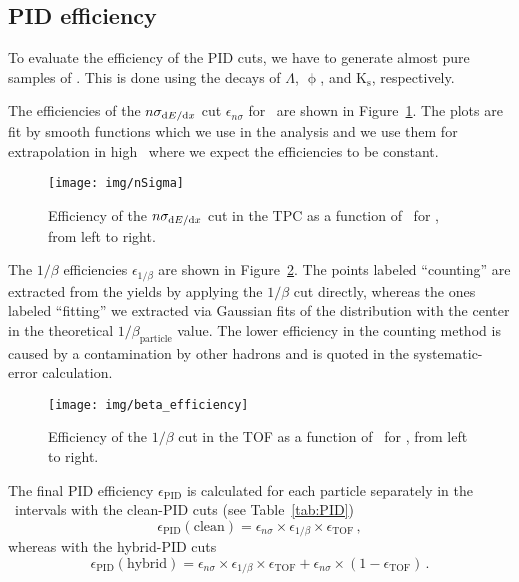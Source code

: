 \subsection{PID efficiency\label{pidEff}}

To evaluate the efficiency of the PID cuts, we have to generate almost pure samples of \pKandpi\@. This is done using the decays of  $\Lambda$, $\upphi$, and  K$_\mathrm{s}$, respectively.

The efficiencies of the $n\sigma_{\mathrm{d} E / \mathrm{d} x}$ cut $\epsilon_{n\sigma}$ for \piKandp\ are shown in Figure~\ref{PID_nsigma}\@. The plots are fit by smooth functions which we use in the analysis and we use them for extrapolation in high \pt\ where we expect the efficiencies to be constant.

\begin{figure}[!htb]
\centering
\texttt{[image: img/nSigma]}
\caption{\label{PID_nsigma} Efficiency of the $n\sigma_{\mathrm{d} E / \mathrm{d} x}$ cut in the TPC as a function of \pt\ for \piKandp, from left to right.}
\end{figure}


The $1/\beta$ efficiencies $\epsilon_{1/\beta}$ are shown in Figure~\ref{PID_beta}\@. The points labeled ``counting'' are extracted from the yields by applying the $1/\beta$ cut directly, whereas the ones labeled ``fitting'' we extracted via Gaussian fits of the distribution with the center in the theoretical $1/\beta_\text{particle}$ value. The lower efficiency in the counting method is caused by a contamination by other hadrons and is quoted in the systematic-error calculation.

\begin{figure}[!htb]
\centering
\texttt{[image: img/beta\_efficiency]}
\caption{\label{PID_beta} Efficiency of the $1/\beta$ cut in the TOF as a function of \pt\ for \piKandp, from left to right.}
\end{figure}

The final PID efficiency $\epsilon_\text{PID}$ is calculated for each particle separately in the \pt\ intervals with the clean-PID cuts (see Table~\ref{tab:PID})
\begin{equation}
 \epsilon_\text{PID} (\text{clean}) = \epsilon_{n\sigma} \times \epsilon_{1/\beta} \times \epsilon_\mathrm{TOF}\,,
\end{equation}
whereas with the hybrid-PID cuts
\begin{equation}
 \epsilon_\text{PID} (\text{hybrid}) = \epsilon_{n\sigma} \times \epsilon_{1/\beta} \times \epsilon_\mathrm{TOF} + \epsilon_{n\sigma} \times (1-\epsilon_\mathrm{TOF})\,.
\end{equation}

